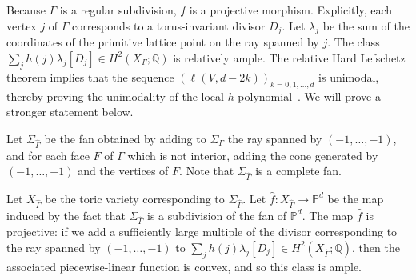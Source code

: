 \documentclass[11pt]{article}
\theoremstyle{definition}
\numberwithin{equation}{section}
\numberwithin{equation}{section}
\begin{document}
Because $\Gamma$ is a regular subdivision, $f$ is a projective morphism. Explicitly, each vertex $j$ of $\Gamma$ corresponds to a torus-invariant divisor $D_j$. Let $\lambda_j$ be the sum of the coordinates of the primitive lattice point on the ray spanned by $j$. The class $\sum_j h(j) \lambda_j [D_j] \in H^2(X_{\Gamma}; \mathbb{Q})$ is relatively ample. 
The relative Hard Lefschetz theorem implies that the sequence $(\ell(V, d - 2k))_{k=0, 1, \dotsc, d}$ is unimodal, thereby proving the unimodality of the local $h$-polynomial~\cite[Theorem~5.2]{Stanleylocalh}. We will prove a stronger statement below. 

Let $\Sigma_{\hat{\Gamma}}$ be the fan obtained by adding to $\Sigma_{\Gamma}$ the ray spanned by $(-1, \dotsc, -1)$, and for each face $F$ of $\Gamma$ which is not interior, adding the cone generated by $(-1, \dotsc, -1)$ and the vertices of $F$. Note that $\Sigma_{\hat{\Gamma}}$ is a complete fan. 

Let $X_{\hat{\Gamma}}$ be the toric variety corresponding to $\Sigma_{\hat{\Gamma}}$. Let $\hat{f} \colon X_{\hat{\Gamma}} \to \mathbb{P}^d$ be the map induced by the fact that $\Sigma_{\hat{\Gamma}}$ is a subdivision of the fan of $\mathbb{P}^d$. The map $\hat{f}$ is projective: if we add a sufficiently large multiple of the divisor corresponding to the ray spanned by $(-1, \dotsc, -1)$ to $\sum_j h(j) \lambda_j [D_j] \in H^2(X_{\hat{\Gamma}}; \mathbb{Q})$, then the associated piecewise-linear function is convex, and so this class is ample. 
\end{document}
